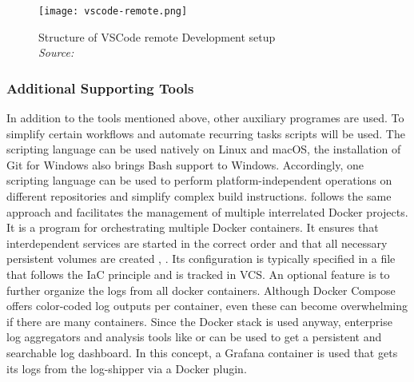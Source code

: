 \documentclass[12pt, a4paper]{article}
\begin{document}
        \begin{figure}[]
            \centering
            \texttt{[image: vscode-remote.png]}
            \caption{Structure of \ac{VSCode} remote Development setup \\\textit{Source:~\cite{vscodedevcontainer}}}\label{fig::vscoderemote}
        \end{figure}

        \subsubsection{Additional Supporting Tools}
        In addition to the tools mentioned above, other auxiliary programes are used. To simplify certain workflows and automate recurring tasks scripts will be used. The  scripting language can be used natively on Linux and macOS, the installation of Git for Windows also brings Bash support to Windows. Accordingly, one scripting language can be used to perform platform-independent operations on different repositories and simplify complex build instructions.  follows the same approach and facilitates the management of multiple interrelated Docker projects. It is a program for orchestrating multiple Docker containers. It ensures that interdependent services are started in the correct order and that all necessary persistent volumes are created \cite{docker2020}, \cite{dockerdocs}. Its configuration is typically specified in a  file that follows the \ac{IaC} principle and is tracked in \ac{VCS}. An optional feature is to further organize the logs from all docker containers. Although Docker Compose offers color-coded log outputs per container, even these can become overwhelming if there are many containers. Since the Docker stack is used anyway, enterprise log aggregators and analysis tools like  or  can be used to get a persistent and searchable log dashboard. In this concept, a Grafana container is used that gets its logs from the  log-shipper via a Docker plugin.
\end{document}
